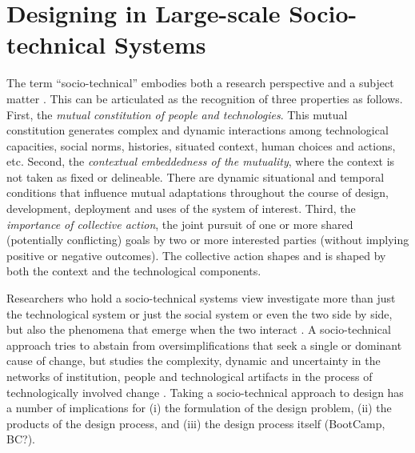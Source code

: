\section{Designing in Large-scale Socio-technical Systems}
\label{sec:design}

The term ``socio-technical'' embodies both a research perspective and a subject matter \cite{Lee2001}.
This can be articulated as the recognition of three properties \cite{Sawyer2014} as follows. 
%
First, the \textit{mutual constitution of people and technologies}. This mutual constitution generates complex and dynamic interactions among technological capacities, social norms, histories, situated context, human choices and actions, etc. 
%
Second, the \textit{contextual embeddedness of the mutuality}, where the context is not taken as fixed or delineable. There are dynamic situational and temporal conditions that influence 
mutual adaptations throughout the course of design, development, deployment and uses of the system of interest. 
% 
Third, the \textit{importance of collective action}, the joint pursuit of one or more shared (potentially conflicting) goals by two or more interested parties (without implying positive or negative outcomes). The collective action shapes and is shaped by both the context and the technological components. 

Researchers who hold a socio-technical systems view investigate more than just the technological system or just the social system or even the two side by side, but also the phenomena that emerge when the two interact \cite{Lee2001}. A socio-technical approach tries to abstain from oversimplifications that seek a single or dominant cause of change, but studies the complexity, dynamic and uncertainty in the networks of institution, people and technological artifacts in the process of technologically involved change \cite{Sawyer2014}. 
%
Taking a socio-technical approach to design has a number of implications for (i) the formulation of the design problem, (ii) the products of the design process, and (iii) the design process itself (BootCamp, BC?).

